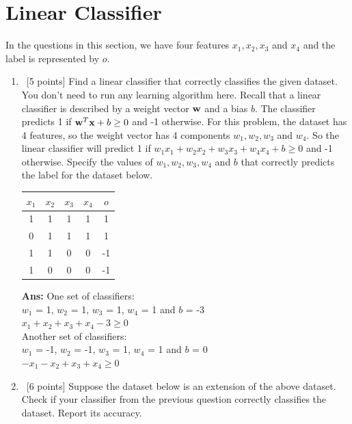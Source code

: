 \documentclass[12pt, fullpage,letterpaper]{article}
\newcommand{\bx}{{\bf x}}
\newcommand{\bw}{{\bf w}}
\begin{document}
\begin{enumerate}
\begin{enumerate}
  \end{enumerate}

\end{enumerate}


\section{Linear Classifier}
\label{sec:q2}
In the questions in this section, we have four features $x_1, x_2, x_3$ and $x_4$ and the label is represented by $o$.
\begin{enumerate}
    \item~[5 points] Find a linear classifier that correctly classifies the given dataset. You don’t need to run any learning algorithm here. 
Recall that a linear classifier is described by a weight vector $\bw$ and a bias $b$. The classifier predicts 1 if $\bw^T\bx + b \ge 0$ and -1 otherwise.
For this problem, the dataset has 4 features, so the weight vector has 4 components $w_1, w_2, w_3$ and $w_4$. So the linear classifier will
predict 1 if $w_1x_1 + w_2x_2 + w_3x_3 + w_4x_4 + b \ge 0$ and -1 otherwise.
Specify the values of $w_1, w_2, w_3, w_4$ and $b$ that correctly predicts the label for the dataset below.

        \begin{table}[h]
            \centering
            \begin{tabular}{cccc|c}
            $x_1$ & $x_2$ & $x_3$ & $x_4$ & $o$  \\ \hline
            1  & 1  & 1  & 1  &  1  \\
            0  & 1  & 1  & 1  &  1  \\
            1  & 1  & 0  & 0  & -1  \\
            1  & 0  & 0  & 0  & -1  \\
            \end{tabular}
        \end{table}
        \textbf{Ans: }One set of classifiers: \\
$w_1$ = 1, $w_2$ = 1, $w_3$ = 1, $w_4$ = 1 and $b$ = -3\\
$x_1 + x_2 + x_3 + x_4 - 3 \geq 0$ \\
Another set of classifiers:\\
$w_1$ = -1, $w_2$ = -1, $w_3$ = 1, $w_4$ = 1 and $b$ = 0\\
$- x_1 - x_2 + x_3 + x_4 \geq 0$

    \item~[6 points] Suppose the dataset below is an extension of the above dataset.
        Check if your classifier from the previous question correctly classifies the dataset.
        Report its accuracy.


\end{enumerate}
\end{document}
